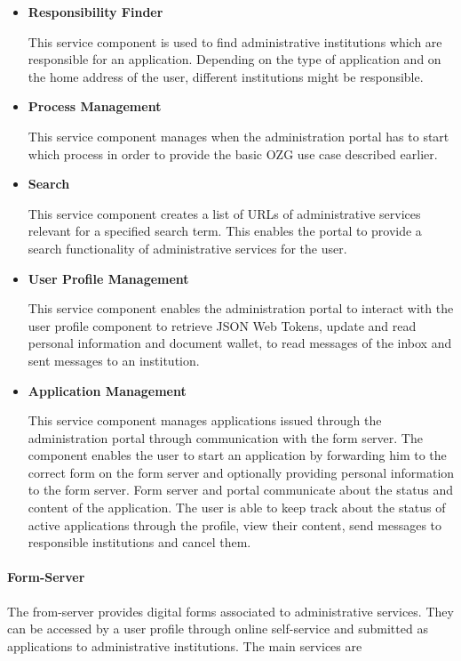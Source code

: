 \documentclass[
     12pt,         %
     a4paper,      %
     BCOR=10mm,version=first,     %
     DIV=14,version=first,        %
     ]{scrreprt}
\begin{document}
\begin{itemize}
    \item \textbf{Responsibility Finder}
    
    This service component is used to find administrative institutions which are responsible for an application. Depending on the type of application and on the home address of the user, different institutions might be responsible.
    
    \item \textbf{Process Management}
    
    This service component manages when the administration portal has to start which process in order to provide the basic OZG use case described earlier.
    
    \item \textbf{Search}
    
    This service component creates a list of URLs of administrative services relevant for a specified search term. This enables the portal to provide a search functionality of administrative services for the user.
    
    \item \textbf{User Profile Management}
    
    This service component enables the administration portal to interact with the user profile component to retrieve JSON Web Tokens, update and read personal information and document wallet, to read messages of the inbox and sent messages to an institution.
    
    \item \textbf{Application Management}
    
    This service component manages applications issued through the administration portal through communication with the form server. The component enables the user to start an application by forwarding him to the correct form on the form server and optionally providing personal information to the form server. Form server and portal communicate about the status and content of the application. The user is able to keep track about the status of active applications through the profile, view their content, send messages to responsible institutions and cancel them.
    
\end{itemize}

\paragraph{Form-Server}
The from-server provides digital forms associated to administrative services. They can be accessed by a user profile through online self-service and submitted as applications to administrative institutions. The main services are \cite{dNRW:Standardisierungskonzeptzur}
\end{document}
